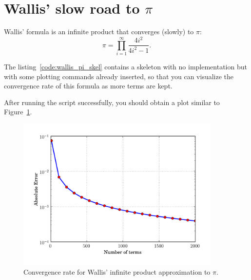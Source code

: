 
\section{Wallis' slow road to $\pi$}

Wallis' formula is an infinite product that converges (slowly) to
$\pi$:\begin{equation}
\pi=\prod_{i=1}^{\infty}\frac{4i^{2}}{4i^{2}-1}.\end{equation}


The listing~\ref{code:wallis_pi_skel} contains a skeleton with no
implementation but with some plotting commands already inserted, so
that you can visualize the convergence rate of this formula as more
terms are kept.



After running the script successfully, you should obtain a plot similar
to Figure~\ref{fig:wallis_pi}.

\begin{center}%
\begin{figure}
\begin{centering}\includegraphics[width=4in]{fig/wallis_pi_convergence}\par\end{centering}


\caption{\label{fig:wallis_pi}Convergence rate for Wallis' infinite product
approximation to $\pi.$}
\end{figure}
\par\end{center}
